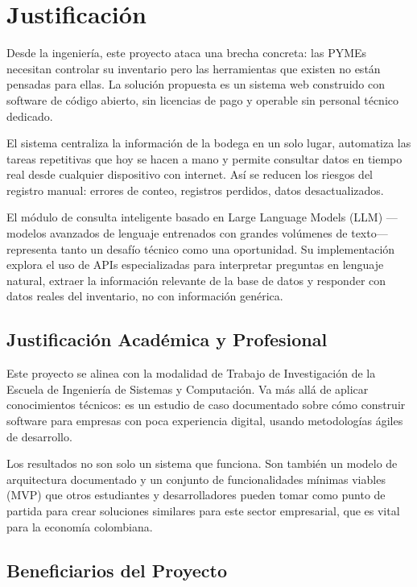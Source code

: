
\section{Justificación}

Desde la ingeniería, este proyecto ataca una brecha concreta: las PYMEs necesitan controlar su inventario pero las herramientas que existen no están pensadas para ellas. La solución propuesta es un sistema web construido con software de código abierto, sin licencias de pago y operable sin personal técnico dedicado.

El sistema centraliza la información de la bodega en un solo lugar, automatiza las tareas repetitivas que hoy se hacen a mano y permite consultar datos en tiempo real desde cualquier dispositivo con internet. Así se reducen los riesgos del registro manual: errores de conteo, registros perdidos, datos desactualizados.

El módulo de consulta inteligente basado en Large Language Models (LLM) ---modelos avanzados de lenguaje entrenados con grandes volúmenes de texto--- representa tanto un desafío técnico como una oportunidad. Su implementación explora el uso de APIs especializadas para interpretar preguntas en lenguaje natural, extraer la información relevante de la base de datos y responder con datos reales del inventario, no con información genérica.


\subsection{Justificación Académica y Profesional}
\label{sec:just_academica}

Este proyecto se alinea con la modalidad de Trabajo de Investigación de la Escuela de Ingeniería de Sistemas y Computación. Va más allá de aplicar conocimientos técnicos: es un estudio de caso documentado sobre cómo construir software para empresas con poca experiencia digital, usando metodologías ágiles de desarrollo.

Los resultados no son solo un sistema que funciona. Son también un modelo de arquitectura documentado y un conjunto de funcionalidades mínimas viables (MVP) que otros estudiantes y desarrolladores pueden tomar como punto de partida para crear soluciones similares para este sector empresarial, que es vital para la economía colombiana.


\subsection{Beneficiarios del Proyecto}
\label{sec:beneficiarios}

